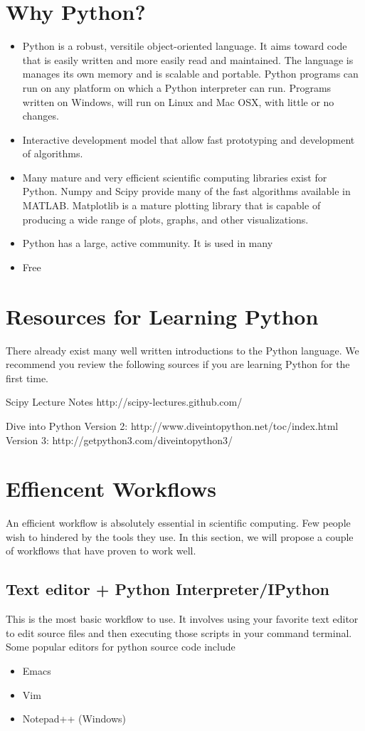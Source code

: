\section*{Why Python?}
\begin{itemize}
\item Python is a robust, versitile object-oriented language.  It aims toward code that is easily written and more easily read and maintained.  The language is manages its own memory and is scalable and portable.  Python programs can run on any platform on which a Python interpreter can run.  Programs written on Windows, will run on Linux and Mac OSX, with little or no changes.
\item Interactive development model that allow fast prototyping and development of algorithms.
\item Many mature and very efficient scientific computing libraries exist for Python.  Numpy and Scipy provide many of the fast algorithms available in MATLAB.  Matplotlib is a mature plotting library that is capable of producing a wide range of plots, graphs, and other visualizations.
\item Python has a large, active community.  It is used in many 
\item Free
\end{itemize}


\section*{Resources for Learning Python}
There already exist many well written introductions to the Python language.  We recommend you review the following sources if you are learning Python for the first time.

Scipy Lecture Notes
http://scipy-lectures.github.com/

Dive into Python
Version 2: http://www.diveintopython.net/toc/index.html
Version 3: http://getpython3.com/diveintopython3/



\section*{Effiencent Workflows}
An efficient workflow is absolutely essential in scientific computing.  Few people wish to hindered by the tools they use.  In this section, we will propose a couple of workflows that have proven to work well.

\subsection*{Text editor + Python Interpreter/IPython}
This is the most basic workflow to use.  It involves using your favorite text editor to edit source files and then executing those scripts in your command terminal.  Some popular editors for python source code include
\begin{itemize}
\item Emacs
\item Vim
\item Notepad++ (Windows)
\end{itemize}

